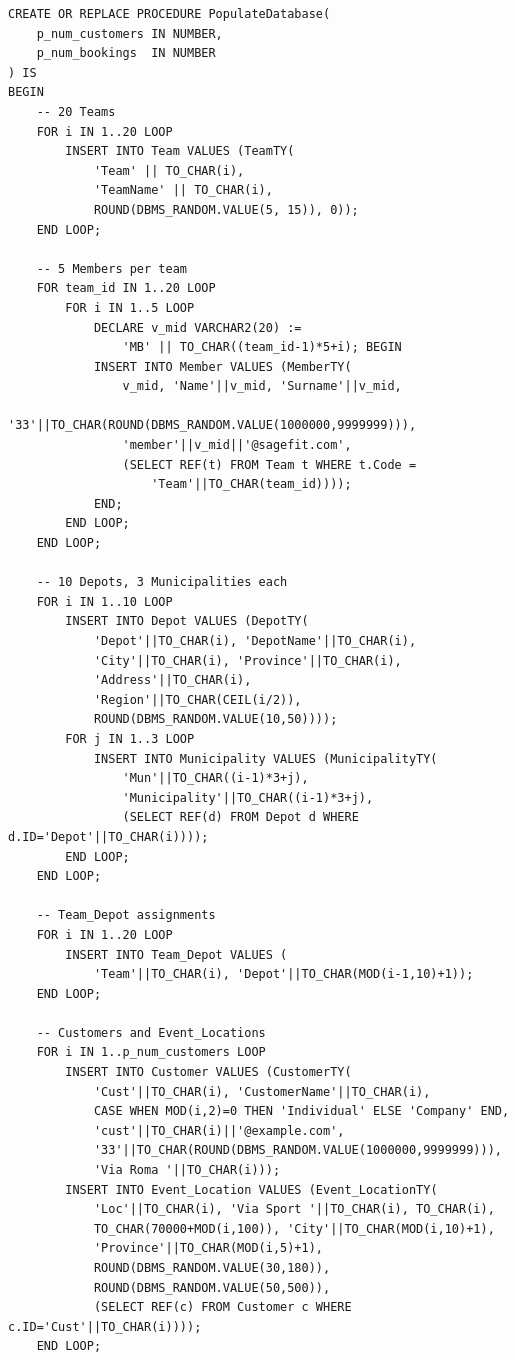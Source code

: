 \begin{lstlisting}
CREATE OR REPLACE PROCEDURE PopulateDatabase(
    p_num_customers IN NUMBER,
    p_num_bookings  IN NUMBER
) IS
BEGIN
    -- 20 Teams
    FOR i IN 1..20 LOOP
        INSERT INTO Team VALUES (TeamTY(
            'Team' || TO_CHAR(i),
            'TeamName' || TO_CHAR(i),
            ROUND(DBMS_RANDOM.VALUE(5, 15)), 0));
    END LOOP;

    -- 5 Members per team
    FOR team_id IN 1..20 LOOP
        FOR i IN 1..5 LOOP
            DECLARE v_mid VARCHAR2(20) :=
                'MB' || TO_CHAR((team_id-1)*5+i); BEGIN
            INSERT INTO Member VALUES (MemberTY(
                v_mid, 'Name'||v_mid, 'Surname'||v_mid,
                '33'||TO_CHAR(ROUND(DBMS_RANDOM.VALUE(1000000,9999999))),
                'member'||v_mid||'@sagefit.com',
                (SELECT REF(t) FROM Team t WHERE t.Code =
                    'Team'||TO_CHAR(team_id))));
            END;
        END LOOP;
    END LOOP;

    -- 10 Depots, 3 Municipalities each
    FOR i IN 1..10 LOOP
        INSERT INTO Depot VALUES (DepotTY(
            'Depot'||TO_CHAR(i), 'DepotName'||TO_CHAR(i),
            'City'||TO_CHAR(i), 'Province'||TO_CHAR(i),
            'Address'||TO_CHAR(i),
            'Region'||TO_CHAR(CEIL(i/2)),
            ROUND(DBMS_RANDOM.VALUE(10,50))));
        FOR j IN 1..3 LOOP
            INSERT INTO Municipality VALUES (MunicipalityTY(
                'Mun'||TO_CHAR((i-1)*3+j),
                'Municipality'||TO_CHAR((i-1)*3+j),
                (SELECT REF(d) FROM Depot d WHERE d.ID='Depot'||TO_CHAR(i))));
        END LOOP;
    END LOOP;

    -- Team_Depot assignments
    FOR i IN 1..20 LOOP
        INSERT INTO Team_Depot VALUES (
            'Team'||TO_CHAR(i), 'Depot'||TO_CHAR(MOD(i-1,10)+1));
    END LOOP;

    -- Customers and Event_Locations
    FOR i IN 1..p_num_customers LOOP
        INSERT INTO Customer VALUES (CustomerTY(
            'Cust'||TO_CHAR(i), 'CustomerName'||TO_CHAR(i),
            CASE WHEN MOD(i,2)=0 THEN 'Individual' ELSE 'Company' END,
            'cust'||TO_CHAR(i)||'@example.com',
            '33'||TO_CHAR(ROUND(DBMS_RANDOM.VALUE(1000000,9999999))),
            'Via Roma '||TO_CHAR(i)));
        INSERT INTO Event_Location VALUES (Event_LocationTY(
            'Loc'||TO_CHAR(i), 'Via Sport '||TO_CHAR(i), TO_CHAR(i),
            TO_CHAR(70000+MOD(i,100)), 'City'||TO_CHAR(MOD(i,10)+1),
            'Province'||TO_CHAR(MOD(i,5)+1),
            ROUND(DBMS_RANDOM.VALUE(30,180)),
            ROUND(DBMS_RANDOM.VALUE(50,500)),
            (SELECT REF(c) FROM Customer c WHERE c.ID='Cust'||TO_CHAR(i))));
    END LOOP;


\end{lstlisting}
